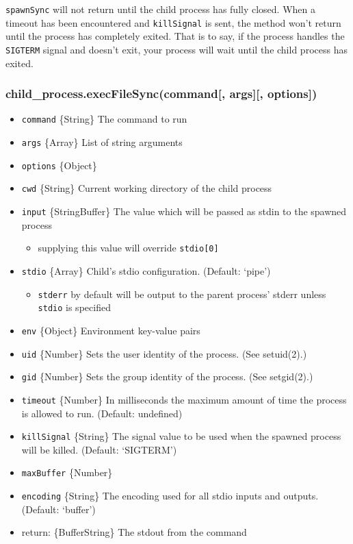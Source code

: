 \texttt{spawnSync} will not return until the child process has fully
closed. When a timeout has been encountered and \texttt{killSignal} is
sent, the method won't return until the process has completely exited.
That is to say, if the process handles the \texttt{SIGTERM} signal and
doesn't exit, your process will wait until the child process has exited.

\subsubsection{child\_process.execFileSync(command{[}, args{]}{[},
options{]})}\label{childux5fprocess.execfilesynccommand-args-options}

\begin{itemize}
\itemsep1pt\parskip0pt
\item
  \texttt{command} \{String\} The command to run
\item
  \texttt{args} \{Array\} List of string arguments
\item
  \texttt{options} \{Object\}
\item
  \texttt{cwd} \{String\} Current working directory of the child process
\item
  \texttt{input} \{String\textbar{}Buffer\} The value which will be
  passed as stdin to the spawned process

  \begin{itemize}
  \itemsep1pt\parskip0pt
  \item
    supplying this value will override \texttt{stdio{[}0{]}}
  \end{itemize}
\item
  \texttt{stdio} \{Array\} Child's stdio configuration. (Default:
  `pipe')

  \begin{itemize}
  \itemsep1pt\parskip0pt
  \item
    \texttt{stderr} by default will be output to the parent process'
    stderr unless \texttt{stdio} is specified
  \end{itemize}
\item
  \texttt{env} \{Object\} Environment key-value pairs
\item
  \texttt{uid} \{Number\} Sets the user identity of the process. (See
  setuid(2).)
\item
  \texttt{gid} \{Number\} Sets the group identity of the process. (See
  setgid(2).)
\item
  \texttt{timeout} \{Number\} In milliseconds the maximum amount of time
  the process is allowed to run. (Default: undefined)
\item
  \texttt{killSignal} \{String\} The signal value to be used when the
  spawned process will be killed. (Default: `SIGTERM')
\item
  \texttt{maxBuffer} \{Number\}
\item
  \texttt{encoding} \{String\} The encoding used for all stdio inputs
  and outputs. (Default: `buffer')
\item
  return: \{Buffer\textbar{}String\} The stdout from the command
\end{itemize}

